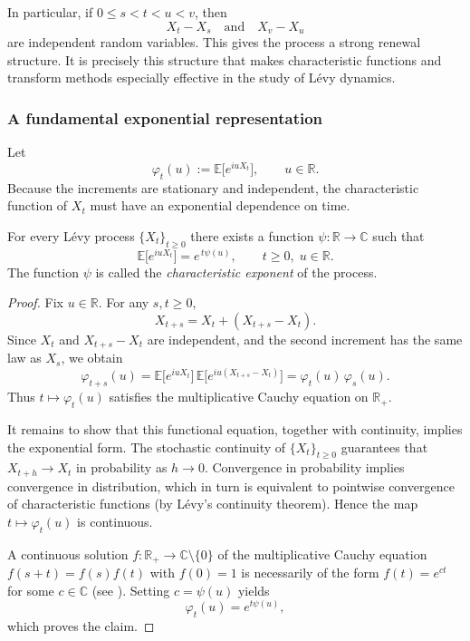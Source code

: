 \medskip

In particular, if $0\leq s<t<u<v$, then
\[
X_t-X_s
\quad\text{and}\quad
X_v-X_u
\]
are independent random variables. This gives the process a strong renewal structure. It is precisely this structure that makes characteristic functions and transform methods especially effective in the study of L\'evy dynamics.
\subsubsection{A fundamental exponential representation}

Let
\begin{equation}
\varphi_t(u):=\mathbb{E}\bigl[e^{iuX_t}\bigr],
\qquad u\in\mathbb{R}.
\end{equation}
Because the increments are stationary and independent, the characteristic function of $X_t$ must have an exponential dependence on time.

\begin{theorem}
For every L\'evy process $\{X_t\}_{t\geq 0}$ there exists a function $\psi:\mathbb{R}\to\mathbb{C}$ such that
\begin{equation}
\mathbb{E}\bigl[e^{iuX_t}\bigr]
=
e^{\,t\psi(u)},
\qquad t\geq 0,\; u\in\mathbb{R}.
\end{equation}
The function $\psi$ is called the \emph{characteristic exponent} of the process.
\end{theorem}

\begin{proof}
Fix $u\in\mathbb{R}$. For any $s,t\geq 0$,
\[
X_{t+s} = X_t + (X_{t+s}-X_t).
\]
Since $X_t$ and $X_{t+s}-X_t$ are independent, and the second increment has the same law as $X_s$, we obtain
\[
\varphi_{t+s}(u)
=
\mathbb{E}\bigl[e^{iuX_t}\bigr]
\,\mathbb{E}\bigl[e^{iu(X_{t+s}-X_t)}\bigr]
=
\varphi_t(u)\,\varphi_s(u).
\]
Thus $t\mapsto \varphi_t(u)$ satisfies the multiplicative Cauchy equation on $\mathbb{R}_+$.

It remains to show that this functional equation, together with continuity, implies the exponential form. The stochastic continuity of $\{X_t\}_{t\geq 0}$ guarantees that $X_{t+h}\to X_t$ in probability as $h\to 0$. Convergence in probability implies convergence in distribution, which in turn is equivalent to pointwise convergence of characteristic functions (by L\'evy's continuity theorem). Hence the map $t\mapsto \varphi_t(u)$ is continuous.

A continuous solution $f:\mathbb{R}_+\to\mathbb{C}\setminus\{0\}$ of the multiplicative Cauchy equation $f(s+t)=f(s)f(t)$ with $f(0)=1$ is necessarily of the form $f(t)=e^{ct}$ for some $c\in\mathbb{C}$ (see \cite[Chapter~7]{Lukacs1970}). Setting $c=\psi(u)$ yields
\[
\varphi_t(u)=e^{t\psi(u)},
\]
which proves the claim.
\end{proof}

